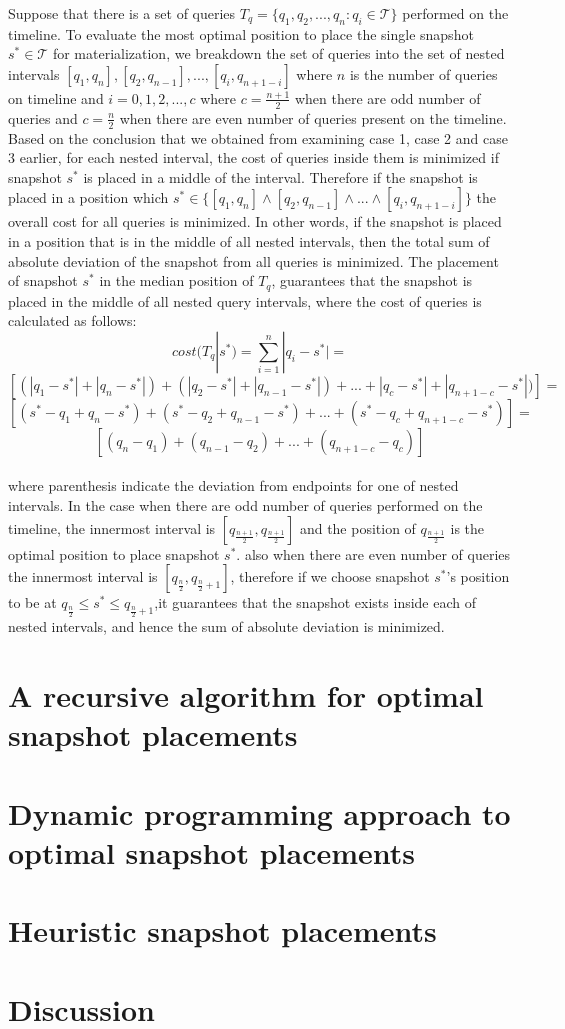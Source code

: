 Suppose that there is a set of queries $T_q=\{q_1,q_2,...,q_n:q_i \in \mathcal{T}\}$ performed on the timeline. To evaluate the most optimal position to place the single snapshot $s^* \in \mathcal{T}$ for materialization, we breakdown the set of queries into the set of nested intervals $[q_1,q_n],[q_2,q_{n-1}],...,[q_i,q_{n+1-i}]$ where $n$ is the number of queries on timeline and $i=0,1,2,...,c$ where $c=\frac{n+1}{2}$ when there are odd number of queries and $c=\frac{n}{2}$ when there are even number of queries present on the timeline.\\ 
Based on the conclusion that we obtained from examining case 1, case 2 and case 3 earlier, for each nested interval, the cost of queries inside them is minimized if snapshot $s^*$ is placed in a middle of the interval. Therefore if the snapshot is placed in a position which $s^*\in \{ [q_1,q_n] \wedge [q_2,q_{n-1}] \wedge ... \wedge [q_i,q_{n+1-i}] \}$ the overall cost for all queries is minimized. In other words, if the snapshot is placed in a position that is in the middle of all nested intervals, then the total sum of absolute deviation of the snapshot from all queries is minimized. The placement of snapshot $s^*$ in the median position of $T_q$, guarantees that the snapshot is placed in the middle of all nested query intervals, where the cost of queries is calculated as follows:
$$cost(T_q|s^*)=\sum_{i=1}^n |q_i-s^*| = $$
$$[(|q_1-s^*|+|q_n-s^*|)+(|q_2-s^*|+|q_{n-1}-s^*|)+...+|q_c-s^*|+|q_{n+1-c}-s^*|)]=$$
$$[(s^*-q_1+q_n-s^*)+(s^*-q_2+q_{n-1}-s^*)+...+(s^*-q_c+q_{n+1-c}-s^*)]=$$
$$[(q_n-q_1)+(q_{n-1}-q_2)+...+(q_{n+1-c}-q_c)]$$\\
where parenthesis indicate the deviation from endpoints for one of nested intervals. In the case when there are odd number of queries performed on the timeline, the innermost interval is $[q_{\frac{n+1}{2}},q_{\frac{n+1}{2}}]$ and the position of $q_{\frac{n+1}{2}}$ is the optimal position to place snapshot $s^*$. also when there are even number of queries the innermost interval is $[q_{\frac{n}{2}},q_{\frac{n}{2}+1}]$, therefore if we choose snapshot $s^*$'s position to be at $q_{\frac{n}{2}}\leq s^*\leq q_{\frac{n}{2}+1}$,it guarantees that the snapshot exists inside each of nested intervals, and hence the sum of absolute deviation is minimized. \\



\section{A recursive algorithm for optimal snapshot placements}

\section{Dynamic programming approach to optimal snapshot placements}

\section{Heuristic snapshot placements}

\section{Discussion}

